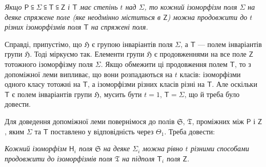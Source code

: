 \documentclass[11pt]{article}
\begin{document}
\emph{Якщо \(\mathsf P \subseteqq \Sigma \subseteqq \mathsf T \subseteqq \mathsf Z\) і \(\mathsf T\) має степінь \(t\) над \(\Sigma\), то кожний ізоморфізм поля \(\Sigma\) на деяке спряжене поле (яке неодмінно міститься в \(\mathsf Z\)) можна продовжити до \(t\) різних ізоморфізмів поля \(\mathsf T\) на спряжені поля.}

Справді, припустімо, що \(\mathfrak H\) є групою інваріантів поля \(\Sigma\), а \(\mathsf T\) --- полем інваріантів групи \(\mathfrak H\). Тоді міркуємо так. Елементи групи \(\mathfrak H\) є продовженнями на все поле \(\mathsf Z\) тотожного ізоморфізму поля \(\Sigma\). Якщо обмежити ці продовження полем \(\mathsf T\), то з допоміжної леми випливає, що вони розпадаються на \(t\) класів: ізоморфізми одного класу тотожні на \(\mathsf T\), а ізоморфізми різних класів різні на \(\mathsf T\). Але оскільки \(\mathsf T\) є полем інваріантів групи \(\mathfrak H\), мусить бути \(t=1\), \(\mathsf T=\Sigma\), що й треба було довести.

Для доведення допоміжної леми повернімося до полів \(\mathfrak S\), \(\mathfrak T\), проміжних між \(\mathsf P\) і \(\mathsf Z\), яким \(\Sigma\) та \(\mathsf T\) поставлено у відповідність через \(\Theta_1\). Треба довести:

\emph{Кожний ізоморфізм \(\mathsf{H}_i\) поля \(\mathfrak S\) на деяке \(\Sigma_i\) можна рівно \(t\) різними способами продовжити до ізоморфізмів поля \(\mathfrak T\) на підполя \(\mathsf T_i\) поля \(\mathsf Z\).}
\end{document}
